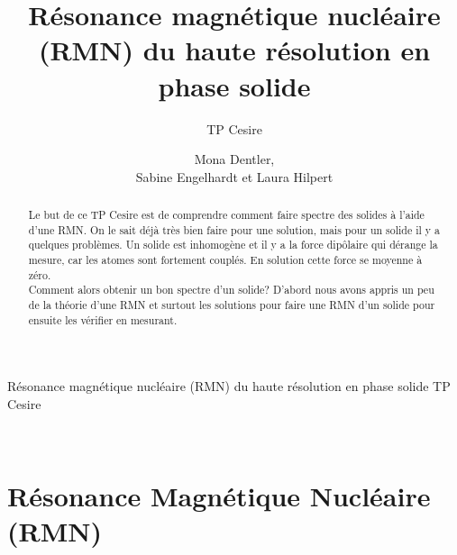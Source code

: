 \documentclass[a4paper,12pt]{scrartcl}
\title{Résonance magnétique nucléaire (RMN) du \isotope[13]{C} haute résolution en phase solide}
\subtitle{TP Cesire}
\author{Mona Dentler,\\ Sabine Engelhardt et Laura Hilpert}
\begin{document}
\nocite{dokument}

 \pagestyle{empty}
 \begin{center}
  \makeatletter
  \@subject
  \vspace{2cm}

  \Huge
  Résonance magnétique nucléaire (RMN) du  haute résolution en phase solide\newline
  \Large TP Cesire
  \vspace{1cm}

  \@author
  \newline\empty\\
  \@publishers


  \@date
  \makeatother
 \end{center}
 \vfill

 \begin{abstract}
  Le but de ce TP Cesire est de comprendre comment faire spectre des solides à l'aide d'une RMN. On le sait déjà très bien faire pour une solution, mais pour un solide il y a quelques problèmes. Un solide est inhomogène et il y a la force dipôlaire qui dérange la mesure, car les atomes sont fortement couplés. En solution cette force se moyenne à zéro.\\ 
  Comment alors obtenir un bon spectre d'un solide? D'abord nous avons appris un peu de la théorie d'une RMN et surtout les solutions pour faire une RMN d'un solide pour ensuite les vérifier en mesurant. 
 \end{abstract}
 \newpage
\pagestyle{scrheadings}
 \tableofcontents

 \section{Résonance Magnétique Nucléaire (RMN)}
\end{document}
